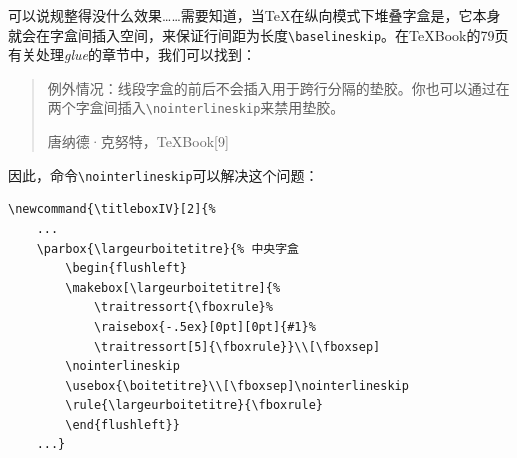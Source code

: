 可以说规整得没什么效果……需要知道，当\TeX 在纵向模式下堆叠字盒是，它本身就会在字盒间插入空间，来保证行间距为长度\verb|\baselineskip|。在\TeX Book的79页有关处理\emph{glue}的章节中，我们可以找到：

\begin{quote}
    例外情况：线段字盒的前后不会插入用于跨行分隔的垫胶。你也可以通过在两个字盒间插入\verb|\nointerlineskip|来禁用垫胶。

    \hfill 唐纳德·克努特，\TeX Book[9]
\end{quote}

因此，命令\verb|\nointerlineskip|可以解决这个问题：

\begin{dmd}
\begin{verbatim}
\newcommand{\titleboxIV}[2]{%
    ...
    \parbox{\largeurboitetitre}{% 中央字盒
        \begin{flushleft}
        \makebox[\largeurboitetitre]{%
            \traitressort{\fboxrule}%
            \raisebox{-.5ex}[0pt][0pt]{#1}%
            \traitressort[5]{\fboxrule}}\\[\fboxsep]
        \nointerlineskip
        \usebox{\boitetitre}\\[\fboxsep]\nointerlineskip
        \rule{\largeurboitetitre}{\fboxrule}
        \end{flushleft}}  
    ...}
\end{verbatim}
\end{dmd}

\newcommand{\titleboxIV}[2]{%
  \begin{lrbox}{\boitetitre}%
    \kern\fboxsep#2\kern\fboxsep
  \end{lrbox}
  \settowidth{\largeurboitetitre}{\usebox{\boitetitre}}%
  \settoheight{\hauteurboitetitre}{\usebox{\boitetitre}}%
  \settodepth{\tempdim}{\usebox{\boitetitre}}%
  \addtolength{\hauteurboitetitre}{\tempdim+2\fboxrule+2\fboxsep}%
  \parbox{\fboxrule}{%
    \rule{\fboxrule}{\hauteurboitetitre}}%
  \parbox{\largeurboitetitre}{%
    \begin{flushleft}
      \makebox[\largeurboitetitre]{%
        \traitressort{\fboxrule}%
        \raisebox{-.5ex}[0pt][0pt]{#1}%
        \traitressort[5]{\fboxrule}}\\[\fboxsep]\nointerlineskip
      \usebox{\boitetitre}\\[\fboxsep]\nointerlineskip
      \rule{\largeurboitetitre}{\fboxrule}
    \end{flushleft}}%
  \parbox{\fboxrule}{%
    \rule{\fboxrule}{\hauteurboitetitre}}}
\enlargethispage{2cm}

